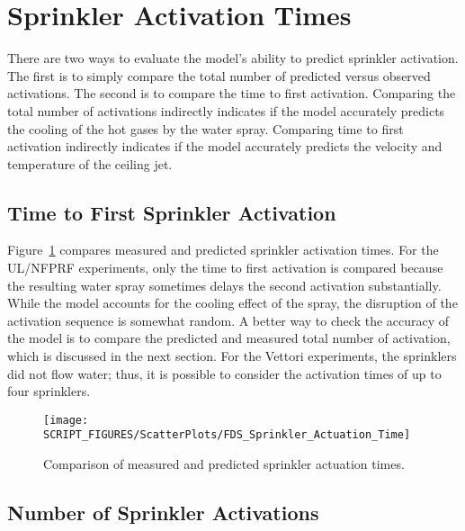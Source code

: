 \clearpage

\section{Sprinkler Activation Times}

There are two ways to evaluate the model's ability to predict sprinkler activation. The first is to simply compare the total number of predicted versus observed activations. The second is to compare the time to first activation. Comparing the total number of activations indirectly indicates if the model accurately predicts the cooling of the hot gases by the water spray. Comparing time to first activation indirectly indicates if the model accurately predicts the velocity and temperature of the ceiling jet.

\subsection{Time to First Sprinkler Activation}
\label{Sprinkler Activation Time}

Figure~\ref{Sprinkler_Activation_Times} compares measured and predicted sprinkler activation times. For the UL/NFPRF experiments, only the time to first activation is compared because the resulting water spray sometimes delays the second activation substantially. While the model accounts for the cooling effect of the spray, the disruption of the activation sequence is somewhat random. A better way to check the accuracy of the model is to compare the predicted and measured total number of activation, which is discussed in the next section. For the Vettori experiments, the sprinklers did not flow water; thus, it is possible to consider the activation times of up to four sprinklers.

\begin{figure}[h]
\begin{center}
\texttt{[image: SCRIPT\_FIGURES/ScatterPlots/FDS\_Sprinkler\_Actuation\_Time]}
\end{center}
\caption[Comparison of measured and predicted sprinkler actuation times]{Comparison of measured and predicted sprinkler actuation times.}
\label{Sprinkler_Activation_Times}
\end{figure}


\clearpage

\subsection{Number of Sprinkler Activations}
\label{UL_NFPRF:Results}
\label{Sprinkler Actuations}

